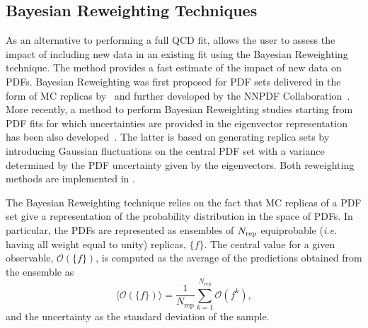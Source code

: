 \subsection{Bayesian Reweighting Techniques}

As an alternative to performing a full QCD fit, \fitter allows the user to assess the impact of including new
data in an existing fit using the Bayesian Reweighting technique. The method
provides a fast estimate of the impact of new data on PDFs. 
Bayesian Reweighting was first proposed for PDF sets delivered in the form of MC replicas by~\cite{Giele:1998gw} and further developed by the NNPDF Collaboration~\cite{Ball:2011gg,Ball:2010gb}. 
More recently, a method to perform Bayesian Reweighting studies starting from PDF fits for which uncertainties
are provided in the eigenvector representation has been also developed~\cite{Watt:2012tq}. The latter is 
based on generating replica sets by introducing Gaussian fluctuations on the central PDF set with a variance 
determined by the PDF uncertainty given by the eigenvectors. Both reweighting methods are implemented in \fitter.

The Bayesian Reweighting technique relies on the fact that MC replicas of a PDF set give 
a representation of the probability distribution in the space of PDFs. In particular, the PDFs are represented 
as ensembles of $N_{\rm rep}$ equiprobable ({\em i.e.} having all weight equal to unity) replicas, $\{f\}$. 
The central value for a given observable, $\mathcal{O}(\{f\})$, is computed as the average of the 
predictions obtained from the ensemble as
\begin{equation}
\langle\mathcal{O}(\{f\})\rangle =  \frac{1}{N_{\mathrm{rep}}} \sum_{k=1}^{N_{\mathrm{rep}}} \mathcal{O}(f^{k}),
\end{equation}
and the uncertainty as the standard deviation of the sample.

